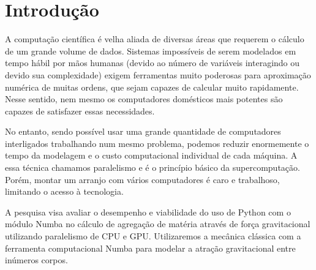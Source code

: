 \documentclass[
	12pt,				%
	a4paper,			%
	english,			%
	openright,				%
	brazil,				%
	oneside]{abntex2}
\begin{document}



\listoftables*

\cleardoublepage


\tableofcontents*
\cleardoublepage
\textual


\chapter*[Introdução]{Introdução}

		A computação científica é velha aliada de diversas áreas que requerem o cálculo de um grande volume de dados. Sistemas impossíveis de serem modelados em tempo hábil por mãos humanas (devido ao número de variáveis interagindo ou devido sua complexidade) exigem ferramentas muito poderosas para aproximação numérica de muitas ordens, que sejam capazes de calcular muito rapidamente. Nesse sentido, nem mesmo os computadores domésticos mais potentes são capazes de satisfazer essas necessidades.

	No entanto, sendo possível usar uma grande quantidade de computadores interligados trabalhando num mesmo problema, podemos reduzir enormemente o tempo da modelagem e o custo computacional individual de cada máquina. A essa técnica chamamos paralelismo e é o princípio básico da supercomputação. Porém, montar um arranjo com vários computadores é caro e trabalhoso, limitando o acesso à tecnologia.

	A pesquisa visa avaliar o desempenho e viabilidade do uso de Python com o módulo Numba no cálculo de agregação de matéria através de força gravitacional utilizando paralelismo de CPU e GPU. Utilizaremos a mecânica clássica com a ferramenta computacional Numba para modelar a atração gravitacional entre inúmeros corpos.
	
\end{document}
